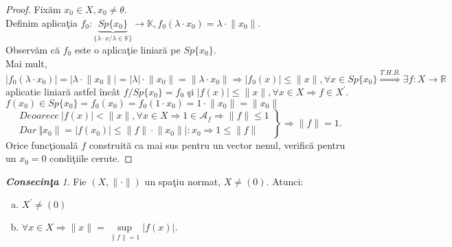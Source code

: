 \documentclass[ a4paper, 12pt]{report}
\theoremstyle{definition}
\theoremstyle{remark}
\newtheorem{cons}{\bf Consecin\c ta }[section]
\numberwithin{equation}{section}
\begin{document}
\begin{proof}
Fix\u am $x_0 \in X, x_0 \neq \theta.$\\
Definim aplica\c tia $f_0 : \underbrace{Sp\{x_0\}}_{\{ \lambda \cdot x / \lambda \in \mathbb{K} \}} \rightarrow \mathbb{K}, f_0(\lambda \cdot x_0) = \lambda \cdot \lVert x_0 \rVert. $\\
Observ\u am c\u a $f_0$ este o aplica\c tie liniar\u a pe $Sp\{ x_0 \}.$\\
Mai mult, $\lvert f_0(\lambda \cdot x_0) \rvert = \lvert \lambda \cdot \lVert x_0 \rVert \rvert = \lvert \lambda \rvert \cdot \lVert x_0  \rVert = \lVert \lambda \cdot x_0 \rVert \Rightarrow \lvert f_0(x) \rvert \leq \lVert x \rVert, \forall x \in Sp\{x_0\} \stackrel{T.H.B.}{\Longrightarrow} \exists f : X \rightarrow \mathbb{R}$ aplicatie liniar\u a astfel \^inc\^at $f/Sp\{x_0\} = f_0$ \c si $\lvert f(x) \rvert \leq \lVert x \rVert, \forall x \in X \Rightarrow f \in X^{'}.$\\
$f(x_0) \in Sp\{x_0\} = f_0(x_0) = f_0(1 \cdot x_0) = 1 \cdot \lVert x_0 \rVert = \lVert x_0 \rVert$\\
\begin{equation*}
  \left.\begin{aligned}
         Deoarece\  \lvert f(x) \rvert < \lVert x \rVert, \forall x \in X \Rightarrow 1 \in \mathcal{A}_{f} \Rightarrow \lVert f \rVert \leq 1\\
        Dar\   \Vert x_0 \rVert = \lvert f(x_0) \rvert \leq \lVert f \rVert \cdot \lVert x_0 \rVert|:x_0 \Rightarrow 1 \leq \lVert f \rVert
        \end{aligned}
  \right\}
  \mbox{$\Rightarrow \lVert f \rVert = 1.$}
 \end{equation*}
Orice func\c tional\u a $f$ construit\u a ca mai sus pentru un vector nenul, verific\u a pentru un $x_0 = 0$ condi\c tiile cerute.
\end{proof}
\begin{cons}
Fie $(X,\lVert \cdot \rVert)$ un spa\c tiu normat, $X \neq (0)$. Atunci:
\begin{enumerate}[(a)]
\item $X^{'} \neq (0)$
\item $\forall x \in X \Rightarrow \lVert x \rVert = \sup\limits_{\lVert f \rVert = 1}\lvert f(x) \rvert.$
\end{enumerate}
\end{cons}
\end{document}
